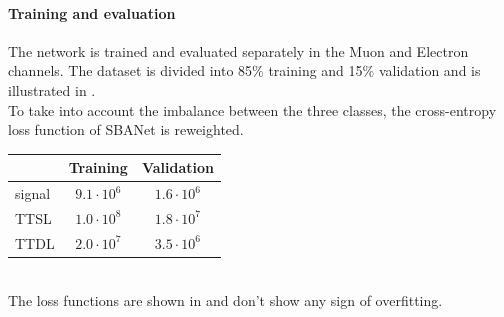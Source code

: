 \begin{minipage}{\linewidth}
    \begin{minipage}{0.52\linewidth}
        \paragraph*{Training and evaluation}
        The network is trained and evaluated separately in the Muon and Electron channels. The dataset is divided into 85\% training and 15\% validation and is illustrated in . \footnotemark\\
        To take into account the imbalance between the three classes, the cross-entropy loss function of SBANet is reweighted.
    \end{minipage}
    \hfill
    \begin{minipage}{0.45\linewidth}
        \centering
        \begin{tabular}{l|c|c}
            \toprule
             & \textbf{Training} & \textbf{Validation}\\
            \midrule
             signal& $9.1 \cdot 10^6$  & $1.6 \cdot 10^6$\\
             TTSL & $1.0 \cdot 10^8$ & $1.8 \cdot 10^7$\\
             TTDL & $2.0\cdot 10^7$ & $3.5 \cdot 10^6$\\
        \end{tabular}
        \label{tab:SBANet_dataset} 
    \end{minipage}
\end{minipage}
\\
The loss functions are shown in  and don't show any sign of overfitting.


